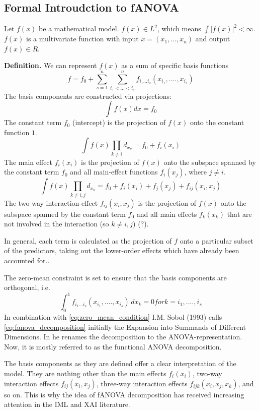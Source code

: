 \subsection*{Formal Introudction to fANOVA}
Let $f(x)$ be a mathematical model. $f(x) \in L^2$, which means $\int|f(x)|^2 < \infty$. $f(x)$ is a multivariate function with input $x = (x_1,\dots, x_n)$ and output $f(x) \in R$.\par
\textbf{Definition.} We can represent $f(x)$ as a sum of specific basis functions
\begin{equation}
    f = f_0 + \sum_{s=1}^{n} \sum_{i_1 <...<i_s}^{n} f_{i_{1}...i_{s}} (x_{i_{1}} , ....,x_{i_{s}})
    \label{eq:fanova_decomposition}
\end{equation}
The basis components are constructed via projections:
\begin{equation}
    \int f(x) dx = f_0
\end{equation}
The constant term $f_0$ (intercept) is the projection of $f(x)$ onto the constant function $1$.
\begin{equation}
    \int f(x) \prod_{k \neq i} d_{x_{k}} = f_0 + f_i(x_i)
\end{equation}
The main effect $f_i(x_i)$ is the projection of $f(x)$ onto the subspace spanned by the constant term $f_0$ and all main-effect functions $f_i(x_j)$, where $j \neq i$. 
\begin{equation}
    \int f(x) \prod_{k \neq i,j} d_{x_{k}} = f_0 + f_i(x_i) + f_j(x_j) + f_{ij}(x_i,x_j)
\end{equation}
The two-way interaction effect $f_{ij}(x_i,x_j)$ is the projection of $f(x)$ onto the subspace spanned by the constant term $f_0$ and all main effects $f_k(x_k)$ that are not involved in the interaction (so $k \neq i,j$) (?).\par
In general, \ldq each term is calculated as the projection of $f$ onto a particular subset of the predictors, taking out the lower-order effects which have already been accounted for.\rdq \cite{hooker_discovering_2004}.\par

The zero-mean constraint is set to ensure that the basis components are orthogonal, i.e.
\begin{equation}
    \int_{0}^{1} f_{i_{1}...i_{s}} (x_{i_{1}}, ...., x_{i_{s}}) \, dx_k = 0 for k = i_1, ...., i_s
    \label{eq:zero_mean_condition}
\end{equation}
In combination with \autoref{eq:zero_mean_condition} I.M. Sobol (1993) calls \autoref{eq:fanova_decomposition} initially the \ldq Expansion into Summands of Different Dimensions\rdq. In \cite{sobol_global_2001} he renames the decomposition to the \ldq ANOVA-representation\rdq. Now, it is mostly referred to as the \ldq functional ANOVA decomposition\rdq \citep{hooker_discovering_2004}.\par
The basis components as they are defined offer a clear interpretation of the model. They are nothing other than the main effects $f_i(x_i)$, two-way interaction effects $f_{ij}(x_i,x_j)$, three-way interaction effects $f_{ijk}(x_i,x_j,x_k)$, and so on. This is why the idea of fANOVA decomposition has received increasing attention in the IML and XAI literature.\par

